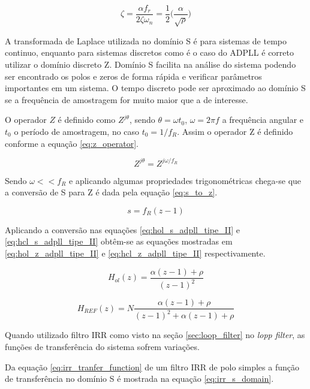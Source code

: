 	\begin{equation}
		\zeta =   \frac{\alpha f_r}{2 \zeta \omega_n} = \frac{1}{2} \big (  \frac{\alpha}{\sqrt{\rho}}\big )
		\label{eq:qsi}
	\end{equation}

A transformada de Laplace utilizada no domínio S é para sistemas de tempo continuo, enquanto para sistemas discretos como é o caso do ADPLL é correto utilizar o domínio discreto Z. Domínio S facilita na análise do sistema podendo ser encontrado os polos e zeros de forma rápida e verificar parâmetros importantes em um sistema. O tempo discreto pode ser aproximado ao domínio S se a frequência de amostragem for muito maior que a de interesse. 

O operador $Z$ é definido como $Z^{j\theta}$, sendo $\theta = \omega t_0$,  $\omega = 2 \pi f$ a frequência angular e $t_0$ o período de amostragem, no caso $t_0 = 1/f_R$. Assim o operador Z é definido conforme a equação \ref{eq:z_operator}.


	\begin{equation}
	Z^{j\theta} = Z^{j\omega /f_R}
	\label{eq:z_operator}
	\end{equation}


Sendo $\omega << f_R$ e aplicando algumas propriedades trigonométricas chega-se que a conversão de S para Z é dada pela equação \ref{eq:s_to_z}.

	\begin{equation}
	s = f_R(z - 1)
	\label{eq:s_to_z}
	\end{equation}


Aplicando a conversão nas equações \ref{eq:hol_s_adpll_tipe_II} e \ref{eq:hcl_s_adpll_tipe_II} obtêm-se as equações mostradas em \ref{eq:hol_z_adpll_tipe_II} e \ref{eq:hcl_z_adpll_tipe_II} respectivamente.

	\begin{equation}
	H_{ol}(z) = \frac{ \alpha (z - 1) + \rho}{ (z - 1)^2}
	\label{eq:hol_z_adpll_tipe_II}
	\end{equation}

	\begin{equation}
	H_{REF}(z) = N \frac{ \alpha (z - 1) + \rho}{ (z - 1)^2 + \alpha (z - 1) + \rho}
	\label{eq:hcl_z_adpll_tipe_II}
	\end{equation}


Quando utilizado filtro IRR como visto na seção \ref{sec:loop_filter} no \textit{lopp filter}, as funções de transferência do sistema sofrem variações.

Da equação \ref{eq:irr_tranfer_function} de um filtro IRR de polo simples a função de transferência no domínio S é mostrada na equação \ref{eq:irr_s_domain}.

